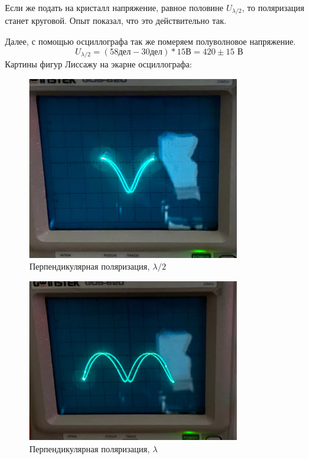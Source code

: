 \documentclass[a4paper, 12pt]{article}
\begin{document}
Если же подать на кристалл напряжение, равное половине $U_{\lambda/2}$, то поляризация станет круговой. Опыт показал, что это действительно так.

Далее, с помощью осциллографа так же померяем полуволновое напряжение.
\begin{equation*}
	U_{\lambda/2} = (58 дел - 30 дел) * 15 В = 420 \pm 15 \text{ В}
\end{equation*}
Картины фигур Лиссажу на экарне осциллографа:

\begin{figure}[H]
    \centering
    \includegraphics[width=0.8\textwidth]{p1}
    \caption{Перпендикулярная поляризация, $\lambda/2$}
    \label{fig:p1}
\end{figure}

\begin{figure}[H]
    \centering
    \includegraphics[width=0.8\textwidth]{p2}
    \caption{Перпендикулярная поляризация, $\lambda$}
    \label{fig:p2}
\end{figure}
\end{document}
